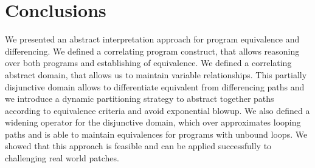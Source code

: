 \section{Conclusions} 

We presented an abstract interpretation approach for program equivalence and differencing. We defined a correlating program construct, that allows reasoning over both programs and establishing of equivalence. We defined a correlating abstract domain, that allows us to maintain variable relationships. This partially disjunctive domain allows to differentiate equivalent from differencing paths and we introduce a dynamic partitioning strategy to abstract together paths according to equivalence criteria and avoid exponential blowup. We also defined a widening operator for the disjunctive domain, which over approximates looping paths and is able to maintain equivalences for programs with unbound loops. We showed that this approach is feasible and can be applied successfully to challenging real world patches.
